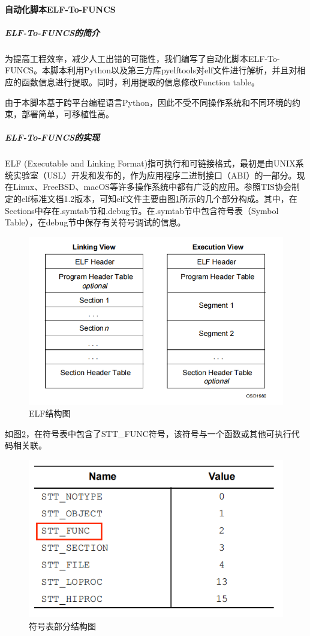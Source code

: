 \documentclass[12pt,a4paper]{ctexart}
\numberwithin{figure}{section}
\begin{document}
\paragraph{自动化脚本ELF-To-FUNCS}
\subparagraph{ELF-To-FUNCS的简介}
\par 为提高工程效率，减少人工出错的可能性，我们编写了自动化脚本ELF-To-FUNCS。本脚本利用Python以及第三方库pyelftools对elf文件进行解析，并且对相应的函数信息进行提取。同时，利用提取的信息修改Function table。
\par 由于本脚本基于跨平台编程语言Python，因此不受不同操作系统和不同环境的约束，部署简单，可移植性高。
\subparagraph{ELF-To-FUNCS的实现}
\par ELF (Executable and Linking Format)指可执行和可链接格式，最初是由UNIX系统实验室（USL）开发和发布的，作为应用程序二进制接口（ABI）的一部分。现在Linux、FreeBSD、macOS等许多操作系统中都有广泛的应用。参照TIS协会制定的elf标准文档1.2版本，可知elf文件主要由图\ref{elf}所示的几个部分构成。其中，在Sections中存在.symtab节和.debug节。在.symtab节中包含符号表（Symbol Table），在debug节中保存有关符号调试的信息。
\begin{figure}
    \centering
    \includegraphics[scale=1.2]{graph/elf_struct.png}
    \caption{ELF结构图}
    \label{elf}
\end{figure}
\par 如图\ref{sf}，在符号表中包含了STT\_FUNC符号，该符号与一个函数或其他可执行代码相关联。
\begin{figure}
    \centering
    \includegraphics[scale=1.2]{graph/stt_func.png}
    \caption{符号表部分结构图}
    \label{sf}
\end{figure}
\end{document}
